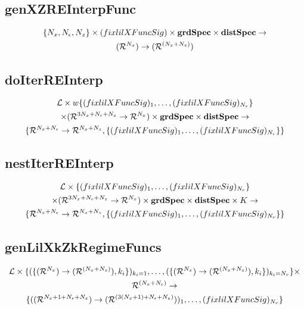 \documentclass[12pt]{article}
\begin{document}
\subsection{genXZREInterpFunc}
\label{sec:genfpfunc}
\begin{gather*}
\{\numX,\numEps,\numZ\}\times(\lilXFuncSig)\times \grdSpec \times  \dstSpec   \rightarrow\\
\bigXFuncSig
\end{gather*}



\subsection{doIterREInterp}
\label{sec:doiterreinterp}

\begin{gather*}
  \linMod \times 
w\{(\lilXFuncSig)_1,\ldots,(\lilXFuncSig)_{\numR}\}  \\
 \times (\eqnFuncSig ) \times \grdSpec \times \dstSpec \rightarrow\\
\{\frfpnsFuncSig, \{(\lilXFuncSig)_1,\ldots,(\lilXFuncSig)_{\numR}\}\}
\end{gather*}



\subsection{nestIterREInterp}
\label{sec:nestiterreinterp}



\begin{gather*}
  \linMod \times 
\{(\lilXFuncSig)_1,\ldots,(\lilXFuncSig)_{\numR}\}  \\
 \times (\eqnFuncSig ) \times \grdSpec \times \dstSpec \times \numIters \rightarrow\\
\{\frfpnsFuncSig, \{(\lilXFuncSig)_1,\ldots,(\lilXFuncSig)_{\numR}\}\}
\end{gather*}



\subsection{genLilXkZkRegimeFuncs}
\label{sec:genlilxkzkregimefunc}
{\small
\begin{gather*}
\linMod \times \{(\{  \bigXFuncSig, k_i \})_{k_i=1},\ldots,(\{  \bigXFuncSig, k_i \})_{k_i=\numR}\} \times\\ \Rn{(\numX+\numEps)} \rightarrow\\
\{(\lilXRegimeFuncSig)_1,\ldots,(\lilXFuncSig)_{\numR}\}
\end{gather*}
}
\end{document}
